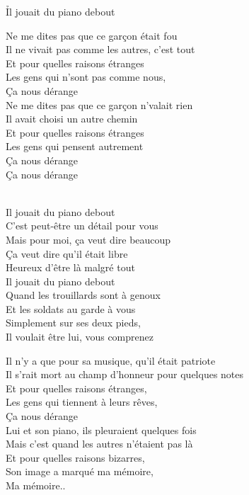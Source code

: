 \documentclass{novel}
\begin{document}
\newpage
\normalsize
\h*{Il jouait du piano debout}
\begin{multicols}{2}
Ne me dites pas que ce garçon était fou \\
Il ne vivait pas comme les autres, c'est tout \\
Et pour quelles raisons étranges \\
Les gens qui n'sont pas comme nous, \\
Ça nous dérange \\

Ne me dites pas que ce garçon n'valait rien \\
Il avait choisi un autre chemin \\
Et pour quelles raisons étranges \\
Les gens qui pensent autrement \\
Ça nous dérange \\
Ça nous dérange \\

\begin{bfseries}
[Refrain:]\\
Il jouait du piano debout \\
C'est peut-être un détail pour vous \\
Mais pour moi, ça veut dire beaucoup \\
Ça veut dire qu'il était libre \\
Heureux d'être là malgré tout \\
Il jouait du piano debout \\
Quand les trouillards sont à genoux \\
Et les soldats au garde à vous \\
Simplement sur ses deux pieds, \\
Il voulait être lui, vous comprenez \\
\end{bfseries}
\columnbreak

Il n'y a que pour sa musique, qu'il était patriote \\
Il s'rait mort au champ d'honneur pour quelques notes \\
Et pour quelles raisons étranges, \\
Les gens qui tiennent à leurs rêves, \\
Ça nous dérange \\

Lui et son piano, ils pleuraient quelques fois \\
Mais c'est quand les autres n'étaient pas là \\
Et pour quelles raisons bizarres, \\
Son image a marqué ma mémoire, \\
Ma mémoire.. \\


\end{multicols}
\end{document}
